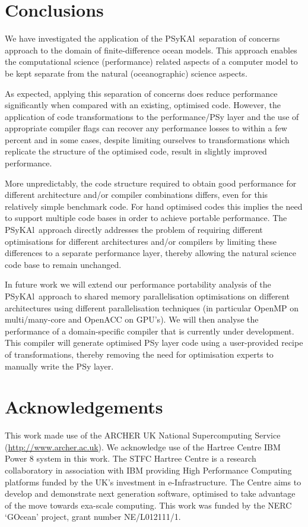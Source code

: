 \documentclass{IOS-Book-Article}
\newcommand{\psykal}{{PS}y{KA}l}
\begin{document}
\section{Conclusions}

We have investigated the application of the \psykal\ separation of
concerns approach to the domain of finite-difference ocean
models. This approach enables the computational science (performance)
related aspects of a computer model to be kept separate from the
natural (oceanographic) science aspects.

As expected, applying this separation of concerns does reduce
performance significantly when compared with an existing, optimised
code. However, the application of code transformations to the
performance/PSy layer and the use of appropriate compiler flags can
recover any performance losses to within a few percent and in some
cases, despite limiting ourselves to transformations which replicate
the structure of the optimised code, result in slightly improved
performance.

More unpredictably, the code structure required to obtain good
performance for different architecture and/or compiler combinations
differs, even for this relatively simple benchmark code. For hand
optimised codes this implies the need to support multiple code bases
in order to achieve portable performance.
%
The \psykal\ approach directly addresses the problem of requiring
different optimisations for different architectures and/or compilers
by limiting these differences to a separate performance layer, thereby
allowing the natural science code base to remain unchanged.

In future work we will extend our performance portability analysis of
the \psykal\ approach to shared memory parallelisation optimisations on
different architectures using different parallelisation techniques (in
particular OpenMP on multi/many-core and OpenACC on GPU's).
%
We will then analyse the performance of a domain-specific compiler
that is currently under development. This compiler will generate
optimised PSy layer code using a user-provided recipe of
transformations, thereby removing the need for optimisation experts to
manually write the PSy layer.

\section*{Acknowledgements}

This work made use of the ARCHER UK National Supercomputing Service
(\url{http://www.archer.ac.uk}). We acknowledge use of the Hartree
Centre IBM Power 8 system in this work. The STFC Hartree Centre is a
research collaboratory in association with IBM providing High
Performance Computing platforms funded by the UK's investment in
e-Infrastructure. The Centre aims to develop and demonstrate next
generation software, optimised to take advantage of the move towards
exa-scale computing. This work was funded by the NERC `GOcean' project,
grant number NE/L012111/1.



%
\end{document}
